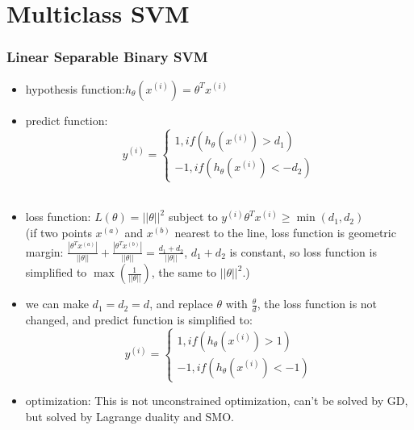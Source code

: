 
\ifx\allfiles\undefined

\fi
\section{Multiclass SVM}
\begin{frame}
\frametitle{Linear Separable Binary SVM}
	\small
	\begin{itemize}
		\item hypothesis function:$h_{\theta}(x^{(i)})=\theta^Tx^{(i)}$\\
		\item predict function:
			\scriptsize
			\begin{equation*}
				y^{(i)}=
				\left\{
					\begin{aligned}
						1, if(h_{\theta}(x^{(i)}) > d_1)\\
						-1, if( h_{\theta}(x^{(i)}) < -d_2)
					\end{aligned}
				\right.
			\end{equation*}\\
		\item loss function: 
			$L(\theta)=||\theta||^2$ subject to $y^{(i)}\theta^Tx^{(i)} \geq \min(d_1,d_2)$\\
			(if two points $x^{(a)}$ and $x^{(b)}$ nearest to the line, loss function is geometric margin: 
			$\frac{|\theta^Tx^{(a)}|}{||\theta||}+\frac{|\theta^Tx^{(b)}|}{||\theta||}=\frac{d_1+d_2}{||\theta||}$, $d_1+d_2$ is constant, so loss function is simplified to $\max(\frac{1}{||\theta||})$, the same to $||\theta||^2$.)
		\item we can make $d_1=d_2=d$, and replace $\theta$ with $\frac{\theta}{d}$, the loss function is not changed, and predict function is simplified to:
			\scriptsize
			\begin{equation*}
				y^{(i)}=
				\left\{
					\begin{aligned}
						1, if(h_{\theta}(x^{(i)}) > 1)\\
						-1, if( h_{\theta}(x^{(i)}) < -1)
					\end{aligned}
				\right.
			\end{equation*}
		\item optimization: This is not unconstrained optimization, can't be solved by GD, but solved by Lagrange duality and SMO. 
	\end{itemize}
\end{frame}
